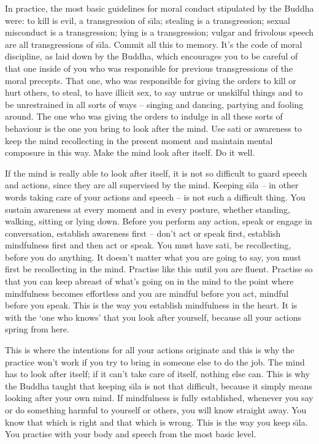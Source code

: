 In practice, the most basic guidelines for moral conduct stipulated by the Buddha were: to kill is evil, a transgression of s\={\i}la; stealing is a transgression; sexual misconduct is a transgression; lying is a transgression; vulgar and frivolous speech are all transgressions of s\={\i}la. Commit all this to memory. It's the code of moral discipline, as laid down by the Buddha, which encourages you to be careful of that one inside of you who was responsible for previous transgressions of the moral precepts. That one, who was responsible for giving the orders to kill or hurt others, to steal, to have illicit sex, to say untrue or unskilful things and to be unrestrained in all sorts of ways -- singing and dancing, partying and fooling around. The one who was giving the orders to indulge in all these sorts of behaviour is the one you bring to look after the mind. Use sati or awareness to keep the mind recollecting in the present moment and maintain mental composure in this way. Make the mind look after itself. Do it well.

If the mind is really able to look after itself, it is not so difficult to guard speech and actions, since they are all supervised by the mind. Keeping s\={\i}la -- in other words taking care of your actions and speech -- is not such a difficult thing. You sustain awareness at every moment and in every posture, whether standing, walking, sitting or lying down. Before you perform any action, speak or engage in conversation, establish awareness first -- don't act or speak first, establish mindfulness first and then act or speak. You must have sati, be recollecting, before you do anything. It doesn't matter what you are going to say, you must first be recollecting in the mind. Practise like this until you are fluent. Practise so that you can keep abreast of what's going on in the mind to the point where mindfulness becomes effortless and you are mindful before you act, mindful before you speak. This is the way you establish mindfulness in the heart. It is with the `one who knows' that you look after yourself, because all your actions spring from here.

This is where the intentions for all your actions originate and this is why the practice won't work if you try to bring in someone else to do the job. The mind has to look after itself; if it can't take care of itself, nothing else can. This is why the Buddha taught that keeping s\={\i}la is not that difficult, because it simply means looking after your own mind. If mindfulness is fully established, whenever you say or do something harmful to yourself or others, you will know straight away. You know that which is right and that which is wrong. This is the way you keep s\={\i}la. You practise with your body and speech from the most basic level.

